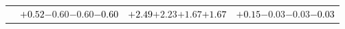 \documentclass[compress]{beamer}
\begin{document}
\begin{frame}
\begin{tabular}{r | c | c | c}
          & \textcolor{black}{$+0.52$}\hspace{0.1 cm}$-0.60$\hspace{0.1 cm}$-0.60$\hspace{0.1 cm}\textcolor{black}{$-0.60$} & \textcolor{black}{$+2.49$}\hspace{0.1 cm}$+2.23$\hspace{0.1 cm}$+1.67$\hspace{0.1 cm}\textcolor{black}{$+1.67$} & \textcolor{black}{$+0.15$}\hspace{0.1 cm}$-0.03$\hspace{0.1 cm}$-0.03$\hspace{0.1 cm}\textcolor{black}{$-0.03$} \\
\end{tabular}
\end{frame}
\end{document}
